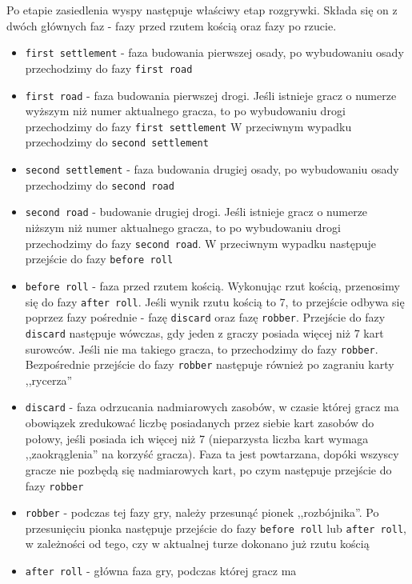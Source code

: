 \documentclass[11pt,twoside]{report}
\begin{document}
Po etapie zasiedlenia wyspy następuje właściwy etap rozgrywki. Składa
się on z dwóch głównych faz - fazy przed rzutem kością oraz fazy po
rzucie.

\begin{itemize}
\item \texttt{first settlement} - faza budowania pierwszej osady, po
  wybudowaniu osady przechodzimy do fazy \texttt{first road}
\item \texttt{first road} - faza budowania pierwszej drogi. Jeśli
  istnieje gracz o numerze wyższym niż numer aktualnego gracza, to po
  wybudowaniu drogi przechodzimy do fazy \texttt{first settlement} W
  przeciwnym wypadku przechodzimy do \texttt{second settlement}
\item \texttt{second settlement} - faza budowania drugiej osady, po
  wybudowaniu osady przechodzimy do \texttt{second road}
\item \texttt{second road} - budowanie drugiej drogi. Jeśli istnieje
  gracz o numerze niższym niż numer aktualnego gracza, to po
  wybudowaniu drogi przechodzimy do fazy \texttt{second road}. W
  przeciwnym wypadku następuje przejście do fazy \texttt{before roll}
\item \texttt{before roll} - faza przed rzutem kością. Wykonując rzut
  kością, przenosimy się do fazy \texttt{after roll}. Jeśli wynik rzutu
  kością to 7, to przejście odbywa się poprzez fazy pośrednie - fazę
  \texttt{discard} oraz fazę \texttt{robber}. Przejście do fazy
  \texttt{discard} następuje wówczas, gdy jeden z graczy posiada więcej
  niż 7 kart surowców. Jeśli nie ma takiego gracza, to przechodzimy do
  fazy \texttt{robber}. Bezpośrednie przejście do fazy \texttt{robber}
  następuje również po zagraniu karty ,,rycerza''
\item \texttt{discard} - faza odrzucania nadmiarowych zasobów, w
  czasie której gracz ma obowiązek zredukować liczbę posiadanych przez
  siebie kart zasobów do połowy, jeśli posiada ich więcej niż 7
  (nieparzysta liczba kart wymaga ,,zaokrąglenia'' na korzyść
  gracza). Faza ta jest powtarzana, dopóki wszyscy gracze nie pozbędą
  się nadmiarowych kart, po czym następuje przejście do fazy
  \texttt{robber}
\item \texttt{robber} - podczas tej fazy gry, należy przesunąć pionek
  ,,rozbójnika''. Po przesunięciu pionka następuje przejście do fazy
  \texttt{before roll} lub \texttt{after roll}, w zależności od tego,
  czy w aktualnej turze dokonano już rzutu kością
\item \texttt{after roll} - główna faza gry, podczas której gracz ma

\end{itemize}
\end{document}
